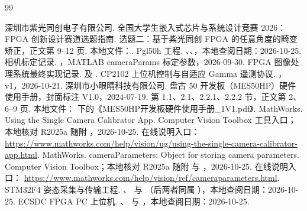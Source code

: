 \begin{thebibliography}{99}
 深圳市紫光同创电子有限公司.
全国大学生嵌入式芯片与系统设计竞赛 2026：FPGA 创新设计赛道选题指南.
选题二：基于紫光同创 FPGA 的任意角度的畸变矫正，正文第 9--12 页.
本地文件：.
 Pgl50h 工程.
、、，本地查阅日期：2026-10-25.
 相机标定记录.
，MATLAB cameraParams 标定参数，2026-09-30.
 FPGA 图像处理系统最终实现记录.
 及
.
 CP2102 上位机控制与自适应 Gamma 遥测协议.
，v1，2026-10-21.
 深圳市小眼睛科技有限公司.
盘古 50 开发板（MES50HP）硬件使用手册，封面标注 V1.0，2024-07-19.
第 1.1、2.1、2.2.1、2.2.2 节，正文第 2、6--9 页.
本地文件： 下的《MES50HP开发板硬件使用手册\_1V1.pdf》.
 MathWorks. Using the Single Camera Calibrator App.
Computer Vision Toolbox 工具入口；本地核对 R2025a 随附
，2026-10-25. 在线说明入口：
\url{https://www.mathworks.com/help/vision/ug/using-the-single-camera-calibrator-app.html}.
 MathWorks. cameraParameters: Object for storing camera parameters.
Computer Vision Toolbox；本地核对 R2025a 随附
 与 ，2026-10-25. 在线说明入口：
\url{https://www.mathworks.com/help/vision/ref/cameraparameters.html}.
 STM32F4 姿态采集与传输工程.
、 与 （后两者同属 ），本地查阅日期：2026-10-25.
 ECSDC FPGA PC 上位机.
、 与 ，本地查阅日期：2026-10-25.
\end{thebibliography}
